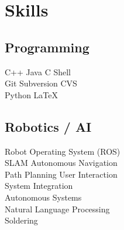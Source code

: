 \documentclass[a4paper]{awesome-deedy}
\begin{document}
\begin{minipage}[t]{0.33\textwidth}




\section{Skills}
\subsection{Programming}
C++ \textbullet{} Java \textbullet{} C \textbullet{} Shell \\
Git \textbullet{} Subversion \textbullet{} CVS \\
Python \textbullet{} \LaTeX\ \\
\sectionsep

\subsection{Robotics / AI}
Robot Operating System (ROS) \\
SLAM \textbullet{} Autonomous Navigation \\
Path Planning \textbullet{} User Interaction \\
System Integration \\
Autonomous Systems\\
Natural Language Processing \\
Soldering \\
\sectionsep


\end{minipage}
\end{document}
